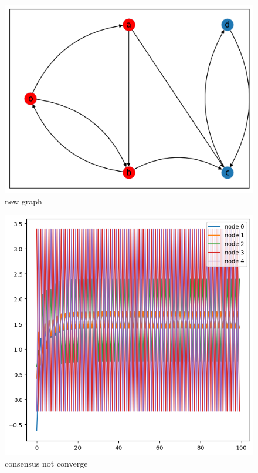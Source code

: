 \documentclass{article}
\begin{document}
\begin{figure}[!htbp]
    \centering
    \includegraphics[width=\linewidth]{fig/1h}   
    \caption{new graph}
   \label{fig:figure100}
\end{figure}

\begin{figure}[!htbp]
    \centering
    \includegraphics[width=\linewidth]{fig/consensus_notconverge}   
    \caption{consensus not converge}
    \label{fig:figure3}
\end{figure}
\end{document}
